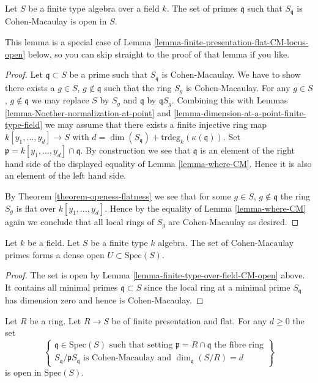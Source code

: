 \begin{lemma}
\label{lemma-finite-type-over-field-CM-open}
Let $S$ be a finite type algebra over a field $k$.
The set of primes $\mathfrak q$ such that $S_{\mathfrak q}$ is
Cohen-Macaulay is open in $S$.
\end{lemma}

\noindent
This lemma is a special case of
Lemma \ref{lemma-finite-presentation-flat-CM-locus-open} below,
so you can skip straight to the proof of that lemma if you like.

\begin{proof}
Let $\mathfrak q \subset S$ be a prime such that $S_{\mathfrak q}$ is
Cohen-Macaulay. We have to show there exists a
$g \in S$, $g \not \in \mathfrak q$ such that the ring
$S_g$ is Cohen-Macaulay. For any $g \in S$, $g \not \in \mathfrak q$
we may replace $S$ by $S_g$ and $\mathfrak q$ by $\mathfrak qS_g$.
Combining this with
Lemmas \ref{lemma-Noether-normalization-at-point} and
\ref{lemma-dimension-at-a-point-finite-type-field}
we may assume that there exists a finite injective
ring map $k[y_1, \ldots, y_d] \to S$ with
$d = \dim(S_{\mathfrak q}) + \text{trdeg}_k(\kappa(\mathfrak q))$.
Set $\mathfrak p = k[y_1, \ldots, y_d] \cap \mathfrak q$.
By construction we see that $\mathfrak q$ is an element of
the right hand side of the displayed equality of
Lemma \ref{lemma-where-CM}. Hence it is also an element of
the left hand side.

\medskip\noindent
By Theorem \ref{theorem-openess-flatness} we see that for some $g \in S$,
$g \not \in \mathfrak q$ the ring $S_g$ is flat over $k[y_1, \ldots, y_d]$.
Hence by the equality of Lemma \ref{lemma-where-CM} again we conclude that
all local rings of $S_g$ are Cohen-Macaulay as desired.
\end{proof}

\begin{lemma}
\label{lemma-generic-CM}
Let $k$ be a field. Let $S$ be a finite type $k$ algebra.
The set of Cohen-Macaulay primes forms a dense open
$U \subset \text{Spec}(S)$.
\end{lemma}

\begin{proof}
The set is open by Lemma \ref{lemma-finite-type-over-field-CM-open} above.
It contains all minimal primes $\mathfrak q \subset S$
since the local ring at a minimal prime $S_{\mathfrak q}$
has dimension zero and hence is Cohen-Macaulay.
\end{proof}

\begin{lemma}
\label{lemma-finite-presentation-flat-CM-locus-open}
Let $R$ be a ring. Let $R \to S$ be of finite presentation
and flat. For any $d \geq 0$ the set
$$
\left\{
\begin{matrix}
\mathfrak q \in \text{Spec}(S)
\text{ such that setting }\mathfrak p = R \cap \mathfrak q
\text{ the fibre ring}\\
S_{\mathfrak q}/\mathfrak pS_{\mathfrak q}
\text{ is Cohen-Macaulay}
\text{ and } \dim_{\mathfrak q}(S/R) = d
\end{matrix}
\right\}
$$
is open in $\text{Spec}(S)$.
\end{lemma}

